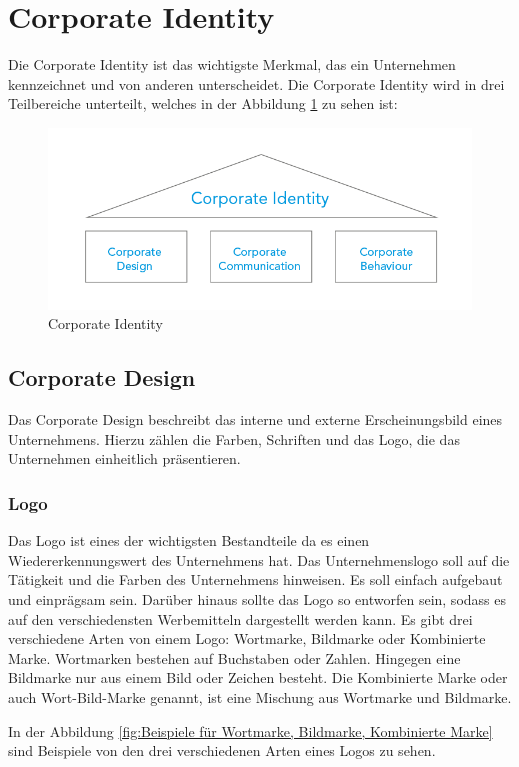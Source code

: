 \section{Corporate Identity}
Die Corporate Identity ist das wichtigste Merkmal, das ein Unternehmen kennzeichnet und von anderen unterscheidet. Die Corporate Identity wird in drei Teilbereiche unterteilt, welches in der Abbildung \ref{fig:CorporateIdentity} zu sehen ist:

\begin{figure}[H]
	\centering
	\includegraphics[width=0.5\linewidth]{images/CorporateIdentity.png}
	\caption[Corporate Identity]{Corporate Identity}
	\label{fig:CorporateIdentity}
\end{figure}

\subsection{Corporate Design}
Das Corporate Design beschreibt das interne und externe Erscheinungsbild eines Unternehmens. Hierzu zählen die Farben, Schriften und das Logo, die das Unternehmen einheitlich präsentieren. \parencite{CorporateIdentity}

\subsubsection{Logo}
Das Logo ist eines der wichtigsten Bestandteile da es einen Wiedererkennungswert des Unternehmens hat. Das Unternehmenslogo soll auf die Tätigkeit und die Farben des Unternehmens hinweisen. Es soll einfach aufgebaut  und einprägsam sein. Darüber hinaus sollte das Logo so entworfen sein, sodass es auf den verschiedensten Werbemitteln dargestellt werden kann. Es gibt drei verschiedene Arten von einem Logo: Wortmarke, Bildmarke oder Kombinierte Marke. Wortmarken bestehen auf Buchstaben oder Zahlen. Hingegen eine Bildmarke nur aus einem Bild oder Zeichen besteht. Die Kombinierte Marke oder auch Wort-Bild-Marke genannt, ist eine Mischung aus Wortmarke und Bildmarke. \parencite{Firmenlogo} 

In der Abbildung \ref{fig:Beispiele für Wortmarke, Bildmarke, Kombinierte Marke} sind Beispiele von den drei verschiedenen Arten eines Logos zu sehen.

